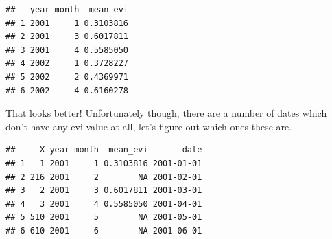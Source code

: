 \documentclass[10pt]{report}
\newenvironment{Shaded}{\begin{snugshade}}{\end{snugshade}}
\newcommand{\AttributeTok}[1]{\textcolor[rgb]{0.77,0.63,0.00}{#1}}
\newcommand{\CommentTok}[1]{\textcolor[rgb]{0.56,0.35,0.01}{\textit{#1}}}
\newcommand{\ConstantTok}[1]{\textcolor[rgb]{0.00,0.00,0.00}{#1}}
\newcommand{\DecValTok}[1]{\textcolor[rgb]{0.00,0.00,0.81}{#1}}
\newcommand{\FloatTok}[1]{\textcolor[rgb]{0.00,0.00,0.81}{#1}}
\newcommand{\FunctionTok}[1]{\textcolor[rgb]{0.00,0.00,0.00}{#1}}
\newcommand{\NormalTok}[1]{#1}
\newcommand{\OtherTok}[1]{\textcolor[rgb]{0.56,0.35,0.01}{#1}}
\newcommand{\SpecialCharTok}[1]{\textcolor[rgb]{0.00,0.00,0.00}{#1}}
\newcommand{\StringTok}[1]{\textcolor[rgb]{0.31,0.60,0.02}{#1}}
\begin{document}
\begin{verbatim}
##   year month  mean_evi
## 1 2001     1 0.3103816
## 2 2001     3 0.6017811
## 3 2001     4 0.5585050
## 4 2002     1 0.3728227
## 5 2002     2 0.4369971
## 6 2002     4 0.6160278
\end{verbatim}

That looks better! Unfortunately though, there are a number of dates
which don't have any evi value at all, let's figure out which ones these
are.

\begin{Shaded}
\end{Shaded}

\begin{verbatim}
##     X year month  mean_evi       date
## 1   1 2001     1 0.3103816 2001-01-01
## 2 216 2001     2        NA 2001-02-01
## 3   2 2001     3 0.6017811 2001-03-01
## 4   3 2001     4 0.5585050 2001-04-01
## 5 510 2001     5        NA 2001-05-01
## 6 610 2001     6        NA 2001-06-01
\end{verbatim}

\begin{Shaded}
\end{Shaded}
\end{document}

